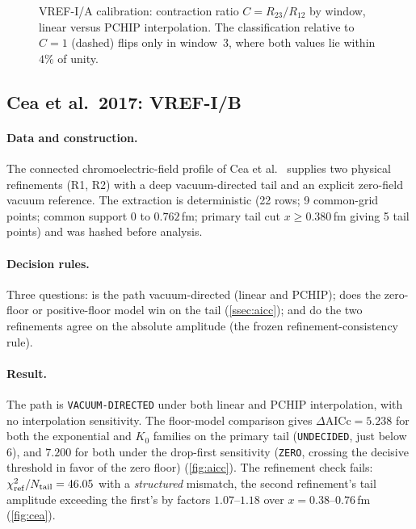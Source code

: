 \documentclass[11pt,a4paper]{article}
\theoremstyle{definition}
\theoremstyle{remark}
\begin{document}
\begin{figure}[t]
\centering
{}
\caption{VREF-I/A calibration: contraction ratio $C=R_{23}/R_{12}$ by window, linear versus PCHIP interpolation. The classification relative to $C=1$ (dashed) flips only in window~3, where both values lie within $4\%$ of unity.}\label{fig:baker}
\end{figure}

\subsection{Cea et al.\ 2017: VREF-I/B}\label{ssec:cea}
\paragraph{Data and construction.} The connected chromoelectric-field profile of Cea et al.\ \cite{Cea17} supplies two physical refinements (R1, R2) with a deep vacuum-directed tail and an explicit zero-field vacuum reference. The extraction is deterministic (22 rows; 9 common-grid points; common support $0$ to $0.762$\,fm; primary tail cut $x\ge0.380$\,fm giving 5 tail points) and was hashed before analysis.
\paragraph{Decision rules.} Three questions: is the path vacuum-directed (linear and PCHIP); does the zero-floor or positive-floor model win on the tail (\cref{ssec:aicc}); and do the two refinements agree on the absolute amplitude (the frozen refinement-consistency rule).
\paragraph{Result.} The path is \texttt{VACUUM-\allowbreak{}DIRECTED} under both linear and PCHIP interpolation, with no interpolation sensitivity. The floor-model comparison gives $\Delta\mathrm{AICc}=5.238$ for both the exponential and $K_0$ families on the primary tail (\texttt{UNDECIDED}, just below $6$), and $7.200$ for both under the drop-first sensitivity (\texttt{ZERO}, crossing the decisive threshold in favor of the zero floor) (\cref{fig:aicc}). The refinement check fails: $\chi^2_{\rm ref}/N_{\rm tail}=46.05$ with a \emph{structured} mismatch, the second refinement's tail amplitude exceeding the first's by factors $1.07$--$1.18$ over $x=0.38$--$0.76$\,fm (\cref{fig:cea}).
\end{document}
